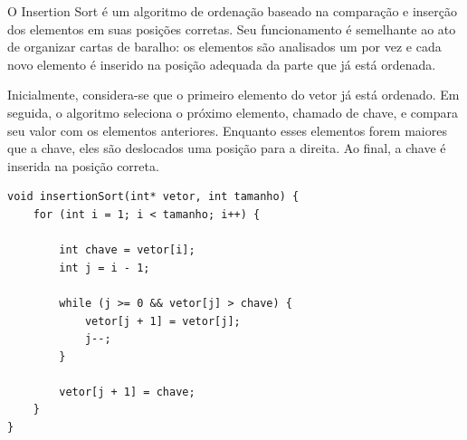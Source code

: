 \quad O Insertion Sort é um algoritmo de ordenação baseado na comparação
e inserção dos elementos em suas posições corretas. Seu funcionamento é
semelhante ao ato de organizar cartas de baralho: os elementos são
analisados um por vez e cada novo elemento é inserido na posição adequada
da parte que já está ordenada.

\quad Inicialmente, considera-se que o primeiro elemento do vetor já está
ordenado. Em seguida, o algoritmo seleciona o próximo elemento, chamado de
chave, e compara seu valor com os elementos anteriores. Enquanto esses
elementos forem maiores que a chave, eles são deslocados uma posição para
a direita. Ao final, a chave é inserida na posição correta.

\begin{lstlisting}[caption={Implementação do Insertion Sort}]
void insertionSort(int* vetor, int tamanho) {
    for (int i = 1; i < tamanho; i++) {

        int chave = vetor[i];
        int j = i - 1;

        while (j >= 0 && vetor[j] > chave) {
            vetor[j + 1] = vetor[j];
            j--;
        }

        vetor[j + 1] = chave;
    }
}
\end{lstlisting}